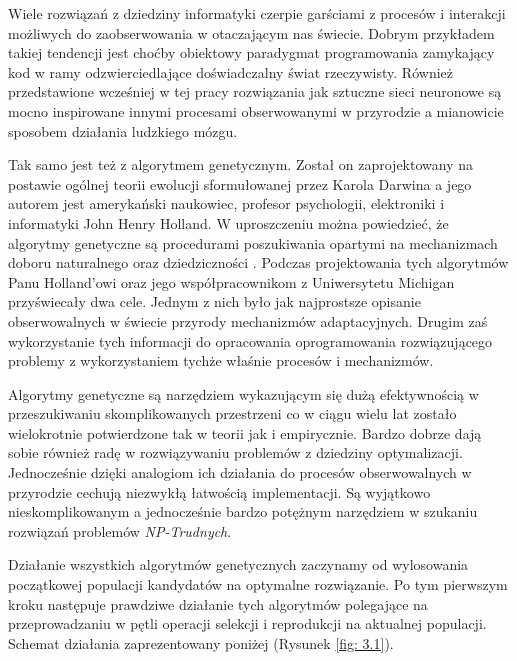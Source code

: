 \documentclass[12pt, oneside, a4paper]{report}
\begin{document}
Wiele rozwiązań z dziedziny informatyki czerpie garściami z procesów i interakcji możliwych do zaobserwowania w otaczającym nas świecie. Dobrym przykładem takiej tendencji jest choćby obiektowy paradygmat programowania zamykający kod w ramy odzwierciedlające doświadczalny świat rzeczywisty. Również przedstawione wcześniej w tej pracy rozwiązania jak sztuczne sieci neuronowe są mocno inspirowane innymi procesami obserwowanymi w przyrodzie a mianowicie sposobem działania ludzkiego mózgu. 

Tak samo jest też z algorytmem genetycznym. Został on zaprojektowany na postawie ogólnej teorii ewolucji sformułowanej przez Karola Darwina a jego autorem jest amerykański naukowiec, profesor psychologii, elektroniki i informatyki John Henry Holland. W uproszczeniu można powiedzieć, że algorytmy genetyczne są procedurami poszukiwania opartymi na mechanizmach doboru naturalnego oraz dziedziczności \citep{goldberg1995algorytmygenetyczne}. Podczas projektowania tych algorytmów Panu Holland'owi oraz jego współpracownikom z Uniwersytetu Michigan przyświecały dwa cele. Jednym z nich było jak najprostsze opisanie obserwowalnych w świecie przyrody mechanizmów adaptacyjnych. Drugim zaś wykorzystanie tych informacji do opracowania oprogramowania rozwiązującego problemy z wykorzystaniem tychże właśnie procesów i mechanizmów.

Algorytmy genetyczne są narzędziem wykazującym się dużą efektywnością w przeszukiwaniu skomplikowanych przestrzeni co w ciągu wielu lat zostało wielokrotnie potwierdzone tak w teorii jak i empirycznie. Bardzo dobrze dają sobie również radę w rozwiązywaniu problemów z dziedziny optymalizacji. Jednocześnie dzięki analogiom ich działania do procesów obserwowalnych w przyrodzie cechują niezwykłą łatwością implementacji. Są wyjątkowo nieskomplikowanym a jednocześnie bardzo potężnym narzędziem w szukaniu rozwiązań problemów \textit{NP-Trudnych}.

Działanie wszystkich algorytmów genetycznych zaczynamy od wylosowania początkowej populacji kandydatów na optymalne rozwiązanie. Po tym pierwszym kroku następuje prawdziwe działanie tych algorytmów polegające na przeprowadzaniu w pętli operacji selekcji i reprodukcji na aktualnej populacji. Schemat działania zaprezentowany poniżej (Rysunek \ref{fig: 3.1}).
\end{document}
